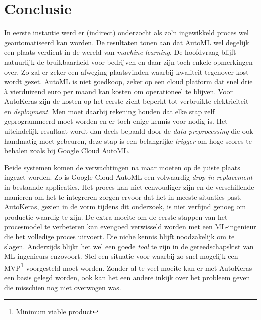 
\chapter{Conclusie}
\label{ch:conclusie}


In eerste instantie werd er (indirect) onderzocht als zo'n ingewikkeld proces wel geautomatiseerd kan worden. De resultaten tonen aan dat AutoML wel degelijk een plaats verdient in de wereld van \textit{machine learning}. De hoofdvraag blijft natuurlijk de bruikbaarheid voor bedrijven en daar zijn toch enkele opmerkingen over. Zo zal er zeker een afweging plaatsvinden waarbij kwaliteit tegenover kost wordt gezet. AutoML is niet goedkoop, zeker op een cloud platform dat snel drie à vierduizend euro per maand kan kosten om operationeel te blijven. Voor AutoKeras zijn de kosten op het eerste zicht beperkt tot verbruikte elektriciteit en \textit{deployment}. Men moet daarbij rekening houden dat elke stap zelf geprogrammeerd moet worden en er toch enige kennis voor nodig is. Het uiteindelijk resultaat wordt dan deels bepaald door de \textit{data preprocessing} die ook handmatig moet gebeuren, deze stap is een belangrijke \textit{trigger} om hoge scores te behalen zoals bij Google Cloud AutoML.

Beide systemen komen de verwachtingen na maar moeten op de juiste plaats ingezet worden. Zo is Google Cloud AutoML een volwaardig \textit{drop in replacement} in bestaande applicaties. Het proces kan niet eenvoudiger zijn en de verschillende manieren om het te integreren zorgen ervoor dat het in meeste situaties past. AutoKeras, gezien in de vorm tijdens dit onderzoek, is niet verfijnd genoeg om productie waardig te zijn. De extra moeite om de eerste stappen van het procesmodel te verbeteren kan evengoed verwisseld worden met een ML-ingenieur die het volledige proces uitvoert. Die niche kennis blijft noodzakelijk om te slagen. Anderzijds blijkt het wel een goede \textit{tool} te zijn in de gereedschapskist van ML-ingenieurs enzovoort. Stel een situatie voor waarbij zo snel mogelijk een MVP\footnote{Minimum viable product} voorgesteld moet worden. Zonder al te veel moeite kan er met AutoKeras een basis gelegd worden, ook kan het een andere inkijk over het probleem geven die misschien nog niet overwogen was. 

